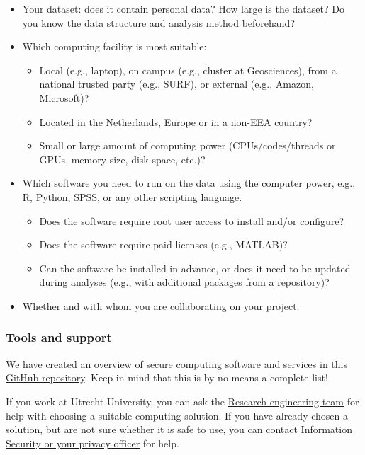 \documentclass[
]{book}
\providecommand{\tightlist}{%
  \setlength{\itemsep}{0pt}\setlength{\parskip}{0pt}}
\begin{document}
\begin{itemize}
\tightlist
\item
  Your dataset: does it contain personal data? How large is the dataset? Do you
  know the data structure and analysis method beforehand?
\item
  Which computing facility is most suitable:

  \begin{itemize}
  \tightlist
  \item
    Local (e.g., laptop), on campus (e.g., cluster at Geosciences), from a
    national trusted party (e.g., SURF), or external (e.g., Amazon, Microsoft)?
  \item
    Located in the Netherlands, Europe or in a non-EEA country?
  \item
    Small or large amount of computing power (CPUs/codes/threads or GPUs, memory
    size, disk space, etc.)?
  \end{itemize}
\item
  Which software you need to run on the data using the computer power, e.g., R,
  Python, SPSS, or any other scripting language.

  \begin{itemize}
  \tightlist
  \item
    Does the software require root user access to install and/or configure?
  \item
    Does the software require paid licenses (e.g., MATLAB)?
  \item
    Can the software be installed in advance, or does it need to be updated
    during analyses (e.g., with additional packages from a repository)?
  \end{itemize}
\item
  Whether and with whom you are collaborating on your project.
\end{itemize}

\hypertarget{computation-support}{%
\subsubsection{Tools and support}\label{computation-support}}

We have created an overview of secure computing software and services in this
\href{https://github.com/UtrechtUniversity/privacy-engineering-tools/blob/main/secure-computing/secure-computing-tools.md}{GitHub repository}.
Keep in mind that this is by no means a complete list!

If you work at Utrecht University, you can ask the
\href{https://www.uu.nl/en/research/research-data-management/contact-us}{Research engineering team}
for help with choosing a suitable computing solution. If you have already
chosen a solution, but are not sure whether it is safe to use, you can contact
\protect\hyperlink{support}{Information Security or your privacy officer} for help.
\end{document}
